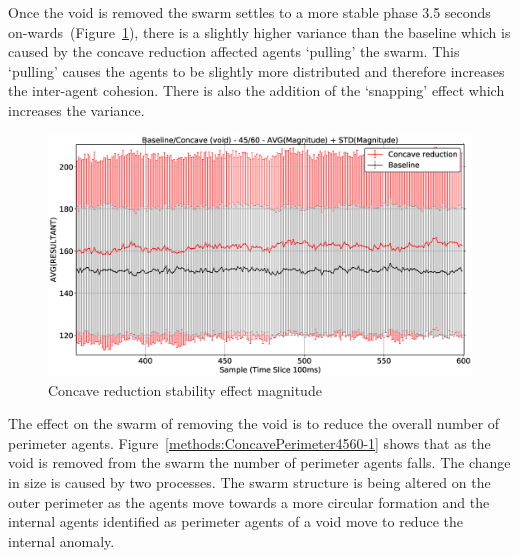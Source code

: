 Once the void is removed the swarm settles to a more stable phase 3.5 seconds on-wards~(Figure~\ref{voids:ConcavePerimeter4560-MAG-2}), there is a slightly higher variance than the baseline which is caused by the concave reduction affected agents `pulling' the swarm. This `pulling' causes the agents to be slightly more distributed and therefore increases the inter-agent cohesion. There is also the addition of the `snapping' effect which increases the variance. 
\begin{figure}[H]
\begin{center}
\includegraphics[width=15cm]{CHAPTER-7/figures/ConcavePerimeter4560-MAG-2}
\end{center}
\caption{Concave reduction stability effect magnitude\label{voids:ConcavePerimeter4560-MAG-2}}
\end{figure}

The effect on the swarm of removing the void is to reduce the overall number of perimeter agents. Figure~\ref{methods:ConcavePerimeter4560-1} shows that as the void is removed from the swarm the number of perimeter agents falls. The change in size is caused by two processes. The swarm structure is being altered on the outer perimeter as the agents move towards a more circular formation and the internal agents identified as perimeter agents of a void move to reduce the internal anomaly. 

